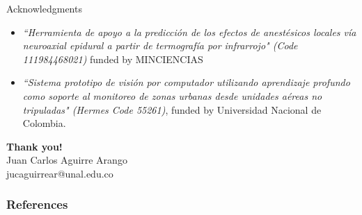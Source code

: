 \documentclass[aspectratio=169]{beamer}
\begin{document}
\begin{frame}{Acknowledgments}

\begin{itemize}
    \item \textit{``Herramienta de apoyo a la predicción de los efectos de anestésicos locales vía neuroaxial epidural a partir de termografía por infrarrojo" (Code 111984468021)} funded by MINCIENCIAS
    \item \textit{``Sistema prototipo de visión por computador utilizando aprendizaje profundo como soporte al monitoreo de zonas urbanas desde unidades aéreas no tripuladas" (Hermes Code 55261)}, funded by Universidad Nacional de Colombia.
\end{itemize}



\begin{center}
	{\large{\textbf{\textcolor[rgb]{0.00,0.00,1.00}{Thank you!}}}}\\
	\vspace{0.1cm}
	 Juan Carlos Aguirre Arango\\ \scriptsize{jucaguirrear@unal.edu.co}
\end{center}    
    
\end{frame}




\begin{frame}[allowframebreaks]
\frametitle{References}
{\tiny 


}
\end{frame}
\end{document}
